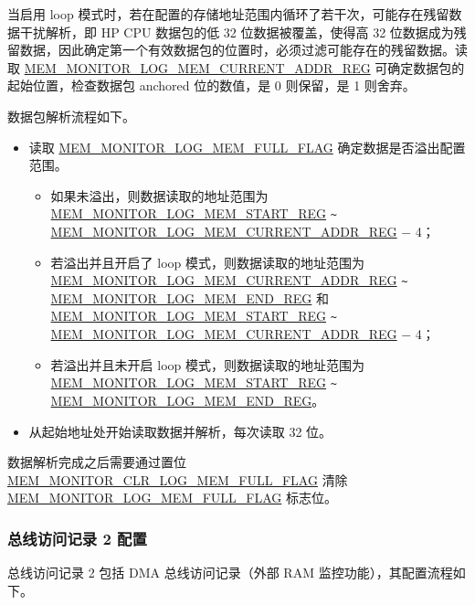 \documentclass[main\_\_CN.tex]{subfiles}
\begin{document}
当启用 loop 模式时，若在配置的存储地址范围内循环了若干次，可能存在残留数据干扰解析，即 HP CPU 数据包的低 32 位数据被覆盖，使得高 32 位数据成为残留数据，因此确定第一个有效数据包的位置时，必须过滤可能存在的残留数据。读取 \hyperref[regdesc:MEMMONITORLOGMEMCURRENTADDRREG]{MEM\_MONITOR\_LOG\_MEM\_CURRENT\_ADDR\_REG} 可确定数据包的起始位置，检查数据包 anchored 位的数值，是 0 则保留，是 1 则舍弃。

数据包解析流程如下。

\begin{itemize}
    \item 读取 \hyperref[fielddesc:MEMMONITORLOGMEMFULLFLAG]{MEM\_MONITOR\_LOG\_MEM\_FULL\_FLAG} 确定数据是否溢出配置范围。
    \begin{itemize}
        \item 如果未溢出，则数据读取的地址范围为 \hyperref[regdesc:MEMMONITORLOGMEMSTARTREG]{MEM\_MONITOR\_LOG\_MEM\_START\_REG} \verb+~+ \hyperref[regdesc:MEMMONITORLOGMEMCURRENTADDRREG]{MEM\_MONITOR\_LOG\_MEM\_CURRENT\_ADDR\_REG} $-$ 4；
        \item 若溢出并且开启了 loop 模式，则数据读取的地址范围为 \hyperref[regdesc:MEMMONITORLOGMEMCURRENTADDRREG]{MEM\_MONITOR\_LOG\_MEM\_CURRENT\_ADDR\_REG} \verb+~+ \hyperref[regdesc:MEMMONITORLOGMEMENDREG]{MEM\_MONITOR\_LOG\_MEM\_END\_REG} 和 \hyperref[regdesc:MEMMONITORLOGMEMSTARTREG]{MEM\_MONITOR\_LOG\_MEM\_START\_REG} \verb+~+ \hyperref[regdesc:MEMMONITORLOGMEMCURRENTADDRREG]{MEM\_MONITOR\_LOG\_MEM\_CURRENT\_ADDR\_REG} $-$ 4；
        \item 若溢出并且未开启 loop 模式，则数据读取的地址范围为 \hyperref[regdesc:MEMMONITORLOGMEMSTARTREG]{MEM\_MONITOR\_LOG\_MEM\_START\_REG} \verb+~+ \hyperref[regdesc:MEMMONITORLOGMEMENDREG]{MEM\_MONITOR\_LOG\_MEM\_END\_REG}。
    \end{itemize}
    \item 从起始地址处开始读取数据并解析，每次读取 32 位。
\end{itemize}

数据解析完成之后需要通过置位 \hyperref[fielddesc:MEMMONITORCLRLOGMEMFULLFLAG]{MEM\_MONITOR\_CLR\_LOG\_MEM\_FULL\_FLAG} 清除 \hyperref[fielddesc:MEMMONITORLOGMEMFULLFLAG]{MEM\_MONITOR\_LOG\_MEM\_FULL\_FLAG} 标志位。


\subsubsection{总线访问记录 2 配置}

总线访问记录 2 包括 DMA 总线访问记录（外部 RAM 监控功能），其配置流程如下。
\end{document}
